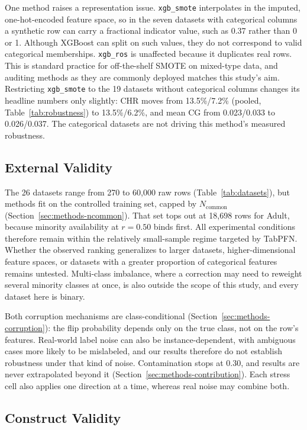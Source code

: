 One method raises a representation issue. \texttt{xgb\_smote} interpolates in
the imputed, one-hot-encoded feature space, so in the seven datasets with
categorical columns a synthetic row can carry a fractional indicator value, such
as 0.37 rather than 0 or 1. Although XGBoost can split on such values, they do
not correspond to valid categorical memberships. \texttt{xgb\_ros} is unaffected
because it duplicates real rows. This is standard practice for off-the-shelf
SMOTE on mixed-type data, and auditing methods as they are commonly deployed
matches this study's aim. Restricting \texttt{xgb\_smote} to the 19 datasets
without categorical columns changes its headline numbers only slightly: CHR
moves from 13.5\%/7.2\% (pooled, Table~\ref{tab:robustness}) to 13.5\%/6.2\%, and
mean CG from 0.023/0.033 to 0.026/0.037. The categorical datasets are not
driving this method's measured robustness.

\subsection{External Validity}
\label{sec:threats-external}

The 26 datasets range from 270 to 60{,}000 raw rows (Table~\ref{tab:datasets}),
but methods fit on the controlled training set, capped by $N_{\text{common}}$
(Section~\ref{sec:methods-ncommon}). That set tops out at 18{,}698 rows for
Adult, because minority availability at $r{=}0.50$ binds first. All experimental
conditions therefore remain within the relatively small-sample regime targeted
by TabPFN. Whether the observed ranking generalizes to larger datasets,
higher-dimensional feature spaces, or datasets with a greater proportion of
categorical features remains untested. Multi-class imbalance, where a correction
may need to reweight several minority classes at once, is also outside the scope
of this study, and every dataset here is binary.

Both corruption mechanisms are class-conditional (Section~\ref{sec:methods-corruption}):
the flip probability depends only on the true class, not on the row's features.
Real-world label noise can also be instance-dependent, with ambiguous cases more
likely to be mislabeled, and our results therefore do not establish robustness
under that kind of noise. Contamination stops at 0.30, and results are never
extrapolated beyond it (Section~\ref{sec:methods-contribution}). Each stress cell
also applies one direction at a time, whereas real noise may combine both.

\subsection{Construct Validity}
\label{sec:threats-construct}

